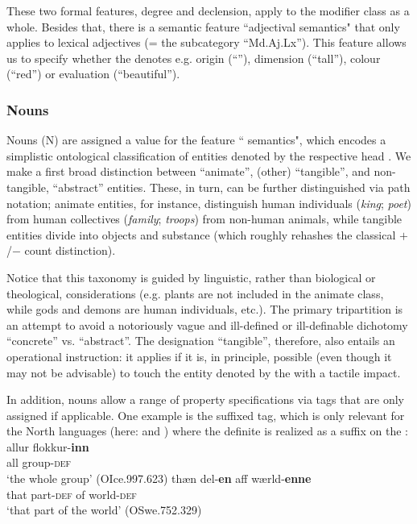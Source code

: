 \documentclass[output=paper,colorlinks,citecolor=brown]{langscibook}
\begin{document}
These two formal features, degree and declension, apply to the modifier class as a whole. Besides that, there is a semantic feature ``adjectival semantics" that only applies to lexical adjectives  (= the subcategory ``Md.Aj.Lx''). This feature allows us to specify whether the  denotes e.g. origin (``''), dimension (``tall''), colour (``red'') or evaluation (``beautiful''). 


\subsubsection{Nouns}

Nouns (N) are assigned a value for the feature `` semantics", which encodes a simplistic ontological classification of entities denoted by the respective head .   We make a first broad distinction between ``{animate}'', (other) ``{tangible}'', and non-tangible, ``{abstract}'' entities. These, in turn, can be further distinguished via path notation; animate entities, for instance, distinguish human individuals (\textit{king}; \textit{poet}) from human collectives (\textit{family}; \textit{troops}) from non-human animals, while tangible entities divide into objects and substance (which roughly rehashes the classical $+$/$-$ count distinction). 

Notice that this taxonomy is guided by linguistic, rather than  biological or theological,  considerations (e.g. plants are not included in the animate class, while gods and demons are human individuals, etc.). The primary tripartition is an attempt to avoid a notoriously vague and  ill-defined or ill-definable dichotomy ``concrete'' vs. ``abstract''. The designation ``tangible'', therefore, also entails an operational instruction: it applies if it is, in principle, possible (even though it may not be advisable) to touch the entity denoted by the  with a tactile impact.  

In addition, nouns  allow  a range of property specifications via tags that are only assigned if applicable. One example is the suffixed  tag, which is only relevant for the North  languages (here:  and ) where the definite  is realized as a suffix on the :
\ea 
    \ea \gll allur flokkur-\textbf{inn}\\   %
             all   group-\textsc{def} \\
        \glt `the whole group'  
        (OIce.997.623)
    \ex \gll thæn del-\textbf{en} aff wærld-\textbf{enne}\\ %
            that part-\textsc{def} of world-\textsc{def}\\
        \glt `that part of the world' 
        (OSwe.752.329)
    \z
\z
\end{document}
